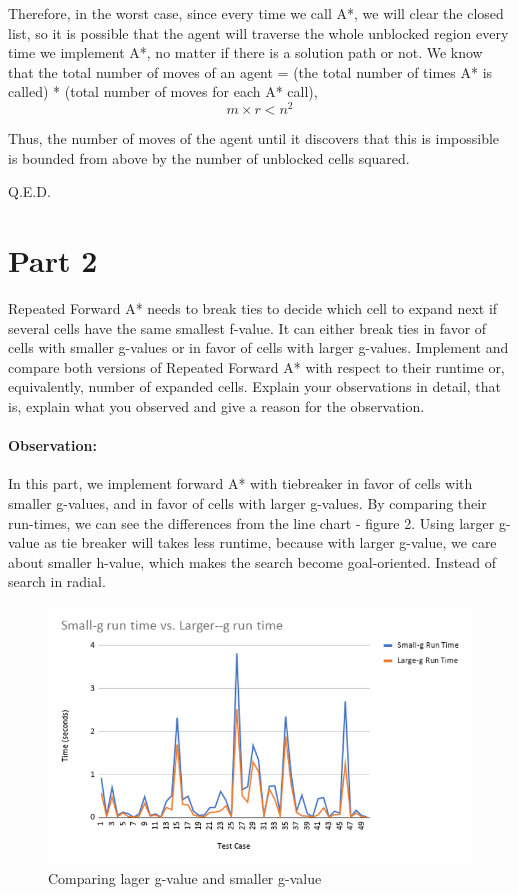 \documentclass[11pt]{report}
\begin{document}
Therefore, in the worst case, since every time we call A*, we will clear the closed list, so it is possible that the agent will traverse the whole unblocked region every time we implement A*, no matter if there is a solution path or not. We know that the total number of moves of an agent =  (the total number of times A* is called) * (total number of moves for each A* call),$$m \times r < n^2$$

Thus, the number of moves of the agent until it discovers that this is impossible is bounded from above by the number of unblocked cells squared. 

Q.E.D.
\newpage

\section*{Part 2}
Repeated Forward A* needs to break ties to decide which cell to expand next if several cells have the same smallest f-value. It can either break ties in favor of cells with smaller g-values or in favor of cells with larger g-values. Implement and compare both versions of Repeated Forward A* with respect to their runtime or, equivalently, number of expanded cells. Explain your observations in detail, that is, explain what you observed and give a reason for the observation.\\

\paragraph{Observation:}

In this part, we implement forward A* with tiebreaker in favor of cells with smaller g-values, and in favor of cells with larger g-values. By comparing their run-times, we can see the differences from the line chart - figure 2. Using larger g-value as tie breaker will takes less runtime, because with larger g-value, we care about smaller h-value, which makes the search become goal-oriented. Instead of search in radial.

\begin{figure}[h]
\begin{center}
\includegraphics[width = 1\textwidth]{Part2_1.jpg} 
\end{center}
\caption{Comparing lager g-value and smaller g-value}
\end{figure}
\end{document}
